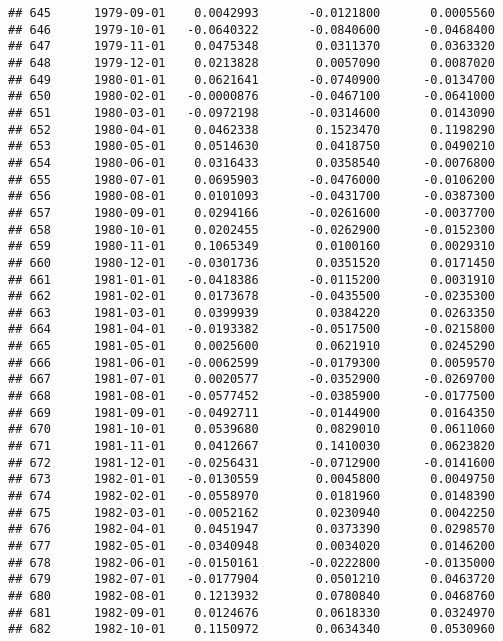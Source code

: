 \documentclass[
]{article}
\begin{document}
\begin{verbatim}
## 645      1979-09-01    0.0042993       -0.0121800       0.0005560
## 646      1979-10-01   -0.0640322       -0.0840600      -0.0468400
## 647      1979-11-01    0.0475348        0.0311370       0.0363320
## 648      1979-12-01    0.0213828        0.0057090       0.0087020
## 649      1980-01-01    0.0621641       -0.0740900      -0.0134700
## 650      1980-02-01   -0.0000876       -0.0467100      -0.0641000
## 651      1980-03-01   -0.0972198       -0.0314600       0.0143090
## 652      1980-04-01    0.0462338        0.1523470       0.1198290
## 653      1980-05-01    0.0514630        0.0418750       0.0490210
## 654      1980-06-01    0.0316433        0.0358540      -0.0076800
## 655      1980-07-01    0.0695903       -0.0476000      -0.0106200
## 656      1980-08-01    0.0101093       -0.0431700      -0.0387300
## 657      1980-09-01    0.0294166       -0.0261600      -0.0037700
## 658      1980-10-01    0.0202455       -0.0262900      -0.0152300
## 659      1980-11-01    0.1065349        0.0100160       0.0029310
## 660      1980-12-01   -0.0301736        0.0351520       0.0171450
## 661      1981-01-01   -0.0418386       -0.0115200       0.0031910
## 662      1981-02-01    0.0173678       -0.0435500      -0.0235300
## 663      1981-03-01    0.0399939        0.0384220       0.0263350
## 664      1981-04-01   -0.0193382       -0.0517500      -0.0215800
## 665      1981-05-01    0.0025600        0.0621910       0.0245290
## 666      1981-06-01   -0.0062599       -0.0179300       0.0059570
## 667      1981-07-01    0.0020577       -0.0352900      -0.0269700
## 668      1981-08-01   -0.0577452       -0.0385900      -0.0177500
## 669      1981-09-01   -0.0492711       -0.0144900       0.0164350
## 670      1981-10-01    0.0539680        0.0829010       0.0611060
## 671      1981-11-01    0.0412667        0.1410030       0.0623820
## 672      1981-12-01   -0.0256431       -0.0712900      -0.0141600
## 673      1982-01-01   -0.0130559        0.0045800       0.0049750
## 674      1982-02-01   -0.0558970        0.0181960       0.0148390
## 675      1982-03-01   -0.0052162        0.0230940       0.0042250
## 676      1982-04-01    0.0451947        0.0373390       0.0298570
## 677      1982-05-01   -0.0340948        0.0034020       0.0146200
## 678      1982-06-01   -0.0150161       -0.0222800      -0.0135000
## 679      1982-07-01   -0.0177904        0.0501210       0.0463720
## 680      1982-08-01    0.1213932        0.0780840       0.0468760
## 681      1982-09-01    0.0124676        0.0618330       0.0324970
## 682      1982-10-01    0.1150972        0.0634340       0.0530960

\end{verbatim}
\end{document}
